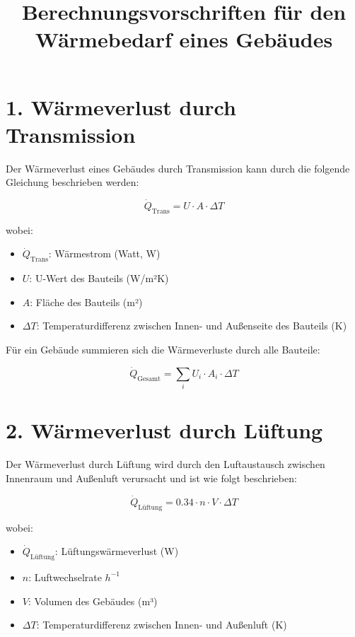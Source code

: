 \documentclass{article}
\title{Berechnungsvorschriften für den Wärmebedarf eines Gebäudes}
\author{}
\date{}
\begin{document}
\maketitle

\sloppy

\section*{1. Wärmeverlust durch Transmission}

Der Wärmeverlust eines Gebäudes durch Transmission kann durch die folgende Gleichung beschrieben werden:

\begin{equation}
\dot{Q}_\text{Trans} = U \cdot A \cdot \Delta T
\end{equation}

\noindent
wobei:
\begin{itemize}
    \item \(\dot{Q}_\text{Trans}\): Wärmestrom (Watt, W)
    \item \(U\): U-Wert des Bauteils (W/m²K)
    \item \(A\): Fläche des Bauteils (m²)
    \item \(\Delta T\): Temperaturdifferenz zwischen Innen- und Außenseite des Bauteils (K)
\end{itemize}

Für ein Gebäude summieren sich die Wärmeverluste durch alle Bauteile:

\begin{equation}
\dot{Q}_\text{Gesamt} = \sum_{i} U_i \cdot A_i \cdot \Delta T
\end{equation}

\section*{2. Wärmeverlust durch Lüftung}

Der Wärmeverlust durch Lüftung wird durch den Luftaustausch zwischen Innenraum und Außenluft verursacht und ist wie folgt beschrieben:

\begin{equation}
\dot{Q}_\text{Lüftung} = 0.34 \cdot n \cdot V \cdot \Delta T
\end{equation}

\noindent
wobei:
\begin{itemize}
    \item \(\dot{Q}_\text{Lüftung}\): Lüftungswärmeverlust (W)
    \item \(n\): Luftwechselrate \(h^{-1}\)
    \item \(V\): Volumen des Gebäudes (m³)
    \item \(\Delta T\): Temperaturdifferenz zwischen Innen- und Außenluft (K)
\end{itemize}
\end{document}
